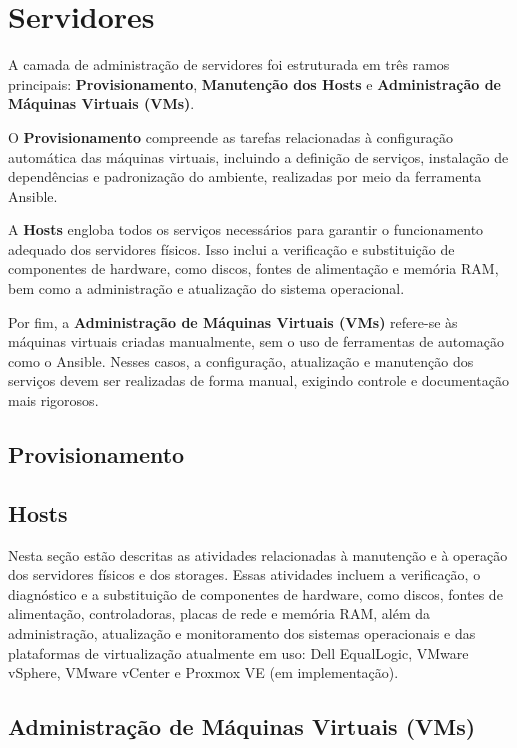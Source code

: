 \chapter{Servidores}

A camada de administração de servidores foi estruturada em três ramos principais: \textbf{Provisionamento}, \textbf{Manutenção dos Hosts} e \textbf{Administração de Máquinas Virtuais (VMs)}.

O \textbf{Provisionamento} compreende as tarefas relacionadas à configuração automática das máquinas virtuais, incluindo a definição de serviços, instalação de dependências e padronização do ambiente, realizadas por meio da ferramenta Ansible.

A \textbf{Hosts} engloba todos os serviços necessários para garantir o funcionamento adequado dos servidores físicos. Isso inclui a verificação e substituição de componentes de hardware, como discos, fontes de alimentação e memória RAM, bem como a administração e atualização do sistema operacional.

Por fim, a \textbf{Administração de Máquinas Virtuais (VMs)} refere-se às máquinas virtuais criadas manualmente, sem o uso de ferramentas de automação como o Ansible. Nesses casos, a configuração, atualização e manutenção dos serviços devem ser realizadas de forma manual, exigindo controle e documentação mais rigorosos.

\section{Provisionamento}


\newpage
\section{Hosts}

Nesta seção estão descritas as atividades relacionadas à manutenção e à operação dos servidores físicos e dos storages. Essas atividades incluem a verificação, o diagnóstico e a substituição de componentes de hardware, como discos, fontes de alimentação, controladoras, placas de rede e memória RAM, além da administração, atualização e monitoramento dos sistemas operacionais e das plataformas de virtualização atualmente em uso: Dell EqualLogic, VMware vSphere, VMware vCenter e Proxmox VE (em implementação).


\newpage
\section{Administração de Máquinas Virtuais (VMs)}

